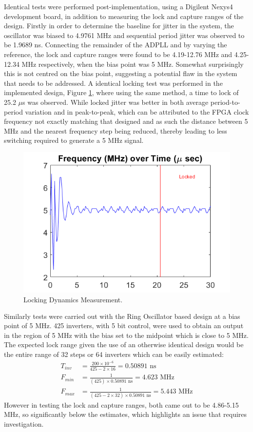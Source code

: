 \documentclass[11pt,english,british]{report}
\begin{document}
Identical tests were performed post-implementation, using a Digilent Nexys4 development board, in addition to measuring the lock and capture ranges of the design. Firstly in order to determine the baseline for jitter in the system, the oscillator was biased to 4.9761 MHz and sequential period jitter was observed to be 1.9689 ns. Connecting the remainder of the ADPLL and by varying the reference, the lock and capture ranges were found to be 4.19-12.76 MHz and 4.25-12.34 MHz respectively, when the bias point was 5 MHz. Somewhat surprisingly this is not centred on the bias point, suggesting a potential flaw in the system that needs to be addressed. A identical locking test was performed in the implemented design, Figure \ref{fig:impl}, where using the same method, a time to lock of 25.2 $\mu$s was observed. While locked jitter was better in both average period-to-period variation and in peak-to-peak, which can be attributed to the FPGA clock frequency not exactly matching that designed and as such the distance between 5 MHz and the nearest frequency step being reduced, thereby leading to less switching required to generate a 5 MHz signal.
\begin{figure}[h]
	\centering
	\includegraphics[scale=0.45]{../sim_locking_rect}
	\caption{Locking Dynamics Measurement.}
	\label{fig:impl}
\end{figure}

Similarly tests were carried out with the Ring Oscillator based design at a bias point of 5 MHz. 425 inverters, with 5 bit control, were used to obtain an output in the region of 5 MHz with the bias set to the midpoint which is close to 5 MHz. The expected lock range given the use of an otherwise identical design would be the entire range of 32 steps or 64 inverters which can be easily estimated:
\begin{align*}
	T_{inv} &= \frac{200\times 10^{-6}}{425-2\times 16} = 0.50891\textrm{~ns} \\
	F_{min} &= \frac{1}{(425)\times 0.50891\textrm{~ns}} = 4.623\textrm{~MHz} \\
	F_{max} &= \frac{1}{(425-2\times 32)\times 0.50891\textrm{~ns}} = 5.443\textrm{~MHz}
\end{align*}
However in testing the lock and capture ranges, both came out to be 4.86-5.15 MHz, so significantly below the estimates, which highlights an issue that requires investigation.
\end{document}
